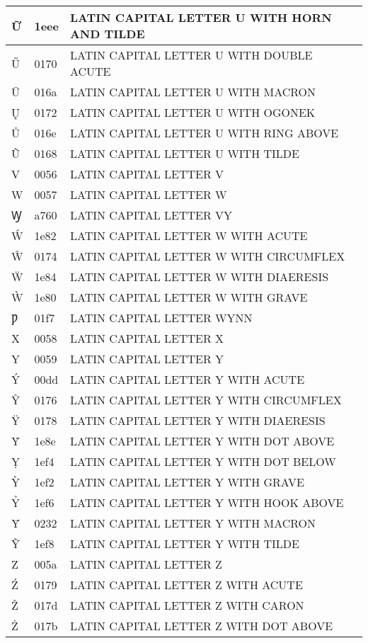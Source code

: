 \documentclass[12pt,letterpaper,openany]{book}
\begin{document}
\begin{center}
\begin{supertabular}{|m{0.25in}|m{0.5in}|m{4in}|}
Ữ & 1eee & LATIN CAPITAL LETTER U WITH HORN AND TILDE\\\hline
Ű & 0170 & LATIN CAPITAL LETTER U WITH DOUBLE ACUTE\\\hline
Ū & 016a & LATIN CAPITAL LETTER U WITH MACRON\\\hline
Ų & 0172 & LATIN CAPITAL LETTER U WITH OGONEK\\\hline
Ů & 016e & LATIN CAPITAL LETTER U WITH RING ABOVE\\\hline
Ũ & 0168 & LATIN CAPITAL LETTER U WITH TILDE\\\hline
V & 0056 & LATIN CAPITAL LETTER V\\\hline
W & 0057 & LATIN CAPITAL LETTER W\\\hline
Ꝡ & a760 & LATIN CAPITAL LETTER VY\\\hline
Ẃ & 1e82 & LATIN CAPITAL LETTER W WITH ACUTE\\\hline
Ŵ & 0174 & LATIN CAPITAL LETTER W WITH CIRCUMFLEX\\\hline
Ẅ & 1e84 & LATIN CAPITAL LETTER W WITH DIAERESIS\\\hline
Ẁ & 1e80 & LATIN CAPITAL LETTER W WITH GRAVE\\\hline
Ƿ & 01f7 & LATIN CAPITAL LETTER WYNN\\\hline
X & 0058 & LATIN CAPITAL LETTER X\\\hline
Y & 0059 & LATIN CAPITAL LETTER Y\\\hline
Ý & 00dd & LATIN CAPITAL LETTER Y WITH ACUTE\\\hline
Ŷ & 0176 & LATIN CAPITAL LETTER Y WITH CIRCUMFLEX\\\hline
Ÿ & 0178 & LATIN CAPITAL LETTER Y WITH DIAERESIS\\\hline
Ẏ & 1e8e & LATIN CAPITAL LETTER Y WITH DOT ABOVE\\\hline
Ỵ & 1ef4 & LATIN CAPITAL LETTER Y WITH DOT BELOW\\\hline
Ỳ & 1ef2 & LATIN CAPITAL LETTER Y WITH GRAVE\\\hline
Ỷ & 1ef6 & LATIN CAPITAL LETTER Y WITH HOOK ABOVE\\\hline
Ȳ & 0232 & LATIN CAPITAL LETTER Y WITH MACRON\\\hline
Ỹ & 1ef8 & LATIN CAPITAL LETTER Y WITH TILDE\\\hline
Z & 005a & LATIN CAPITAL LETTER Z\\\hline
Ź & 0179 & LATIN CAPITAL LETTER Z WITH ACUTE\\\hline
Ž & 017d & LATIN CAPITAL LETTER Z WITH CARON\\\hline
Ż & 017b & LATIN CAPITAL LETTER Z WITH DOT ABOVE\\\hline

\end{supertabular}
\end{center}
\end{document}
